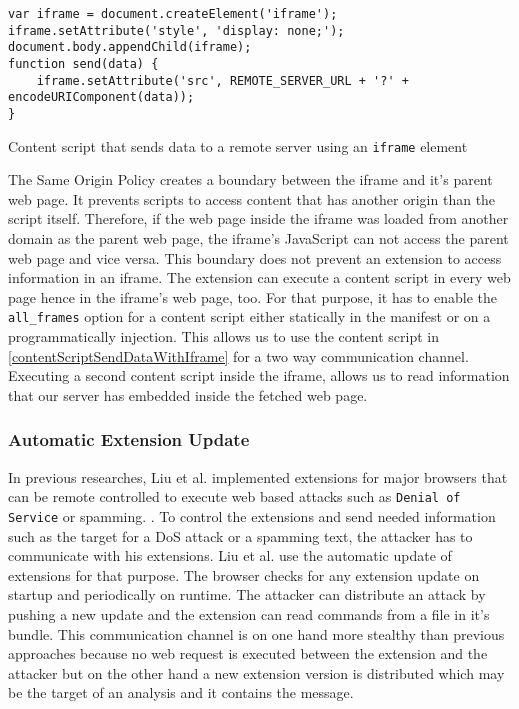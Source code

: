 	\begin{code}
		\begin{lstlisting}
var iframe = document.createElement('iframe');
iframe.setAttribute('style', 'display: none;');
document.body.appendChild(iframe);
function send(data) {
	iframe.setAttribute('src', REMOTE_SERVER_URL + '?' + encodeURIComponent(data));
}
\end{lstlisting}
		\caption{Content script that sends data to a remote server using an \texttt{iframe} element}
		\label{contentScriptSendDataWithIframe}
	\end{code}
	
	The Same Origin Policy creates a boundary between the iframe and it's parent web page. It prevents scripts to access content that has another origin than the script itself. Therefore, if the web page inside the iframe was loaded from another domain as the parent web page, the iframe's JavaScript can not access the parent web page and vice versa. This boundary does not prevent an extension to access information in an iframe. The extension can execute a content script in every web page hence in the iframe's web page, too. For that purpose, it has to enable the \texttt{all\_frames} option for a content script either statically in the manifest or on a programmatically injection. This allows us to use the content script in \autoref{contentScriptSendDataWithIframe} for a two way communication channel. Executing a second content script inside the iframe, allows us to read information that our server has embedded inside the fetched web page. 
	
\subsubsection{Automatic Extension Update}

	In previous researches, Liu et al. implemented extensions for major browsers that can be remote controlled to execute web based attacks such as \texttt{Denial of Service} or spamming. \cite{liu2011botnet, Liu12chromeextensions:}. To control the extensions and send needed information such as the target for a DoS attack or a spamming text, the attacker has to communicate with his extensions. Liu et al. use the automatic update of extensions for that purpose. The browser checks for any extension update on startup and periodically on runtime. The attacker can distribute an attack by pushing a new update and the extension can read commands from a file in it's bundle. This communication channel is on one hand more stealthy than previous approaches because no web request is executed between the extension and the attacker but on the other hand a new extension version is distributed which may be the target of an analysis and it contains the message. 
	
